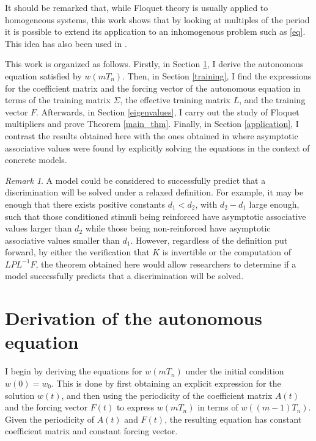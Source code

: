 \documentclass[]{interact}
\theoremstyle{plain}%
\theoremstyle{definition}
\theoremstyle{remark}
\newtheorem{remark}{Remark}
\begin{document}
It should be remarked that, while Floquet theory is usually applied to homogeneous systems, this work shows that by looking at multiples of the period it is possible to extend its application to an inhomogenous problem such as \eqref{eq}. This idea has also been used in \cite{ST11}.

This work is organized as follows. Firstly, in Section \ref{derivations}, I derive the autonomous equation satisfied by $w(mT_n)$. Then, in Section \ref{training}, I find the expressions for the coefficient matrix and the forcing vector of the autonomous equation in terms of the training matrix $\Sigma$, the effective training matrix $L$, and the training vector $F$. Afterwards, in Section \ref{eigenvalues}, I carry out the study of Floquet multipliers and prove Theorem \ref{main_thm}. Finally, in Section \ref{application}, I contrast the results obtained here with the ones obtained in \cite{A24} where asymptotic associative values were found by explicitly solving the equations in the context of concrete models. 

\begin{remark}
 A model could be considered to successfully predict that a discrimination will be solved under a relaxed definition. For example, it may be enough that there exists positive constants $d_1<d_2$, with $d_2-d_1$ large enough, such that those conditioned stimuli being reinforced have asymptotic associative values larger than $d_2$ while those being non-reinforced have asymptotic associative values smaller than $d_1$. However, regardless of the definition put forward, by either the verification that $K$ is invertible or the computation of $LPL^{-1}F$, the theorem obtained here would allow researchers to determine if a model successfully predicts that a discrimination will be solved.
\end{remark}

\section{Derivation of the autonomous equation}\label{derivations}

I begin by deriving the equations for $w(mT_n)$ under the initial condition $w(0)=w_0$. This is done by first obtaining an explicit expression for the solution $w(t)$, and then using the periodicity of the coefficient matrix $A(t)$ and the forcing vector $F(t)$ to express $w(mT_n)$ in terms of $w((m-1)T_n)$. Given the periodicity of $A(t)$ and $F(t)$, the resulting equation has constant coefficient matrix and constant forcing vector. 
\end{document}
